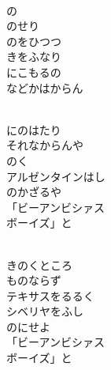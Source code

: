 \documentclass[10pt,b5j]{tarticle} %
\begin{document}
\begin{enumerate}
\begin{minipage}[c]{\blocksize}
    \end{minipage}
    \begin{minipage}[c]{\blocksize}
        
        \vspace{\linespace}
        \item~\\
        の\\
        のせり\\
        のをひつつ\\
        きをふなり\\
        にこもるの\\
        などかはからん
        
    \end{minipage}
    \begin{minipage}[c]{\blocksize}
        
        \vspace{\linespace}
        \item~\\
        にのはたり\\
        それなからんや\\
        のく\\
        アルゼンタインはし\\
        のかざるや\\
        「ビーアンビシァス\\
        ボーイズ」と
        
    \end{minipage}
    \begin{minipage}[c]{\blocksize}
        
        \vspace{\linespace}
        \item~\\
        きのくところ\\
        ものならず\\
        テキサスをるるく\\
        シベリヤをふし\\
        のにせよ\\
        「ビーアンビシァス\\
        ボーイズ」と
    
    \end{minipage}
\end{enumerate} %
\end{document}
